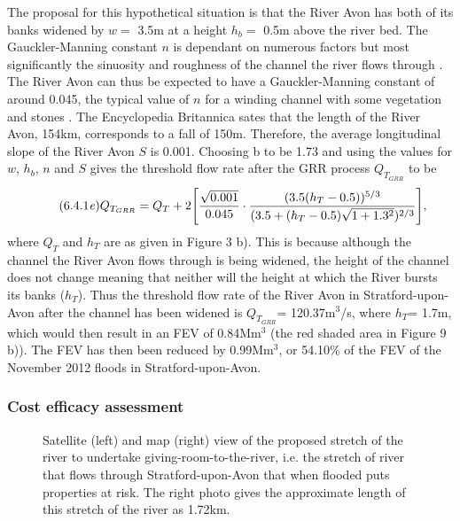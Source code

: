 \documentclass[11pt,a4paper]{article}
\begin{document}
The proposal for this hypothetical situation is that the River Avon has both of its banks widened by $w=$ 3.5m at a height $h_b=$ 0.5m above the river bed. The Gauckler-Manning constant $n$ is dependant on numerous factors but most significantly the sinuosity and roughness of the channel the river flows through \cite{manning}. The River Avon can thus be expected to have a Gauckler-Manning constant of around 0.045, the typical value of $n$ for a winding channel with some vegetation and stones \cite{n}. The Encyclopedia Britannica \cite{britannica} sates that the length of the River Avon, 154km, corresponds to a fall of 150m. Therefore, the average longitudinal slope of the River Avon $S$ is 0.001. Choosing b to be 1.73 and using the values for $w$, $h_b$, $n$ and $S$ gives the threshold flow rate after the GRR process $Q_{T_{GRR}}$ to be
\begin{equation}\tag{6.4.1\textit{e}}
Q_{T_{GRR}}=Q_T+2\Bigg[\frac{\sqrt{0.001}}{0.045}\cdot\frac{(3.5(h_T-0.5))^{5/3}}{(3.5+(h_T-0.5)\sqrt{1+1.3^2})^{2/3}}\Bigg],
\end{equation}
where $Q_T$ and $h_T$ are as given in Figure 3 b). This is because although the channel the River Avon flows through is being widened, the height of the channel does not change meaning that neither will the height at which the River bursts its banks ($h_T$). Thus the threshold flow rate of the River Avon in Stratford-upon-Avon after the channel has been widened is $Q_{T_{GRR}}$= 120.37m$^3$/s, where $h_T$= 1.7m, which would then result in an FEV of 0.84Mm$^3$ (the red shaded area in Figure 9 b)). The FEV has then been reduced by 0.99Mm$^3$, or 54.10\% of the FEV of the November 2012 floods in Stratford-upon-Avon.

\subsubsection{Cost efficacy assessment}
\begin{figure}[ht!]
\caption{Satellite (left) and map (right) view \cite{maps} of the proposed stretch of the river to undertake giving-room-to-the-river, i.e. the stretch of river that flows through Stratford-upon-Avon that when flooded puts properties at risk. The right photo gives the approximate length of this stretch of the river as 1.72km.}
\end{figure}
\end{document}
